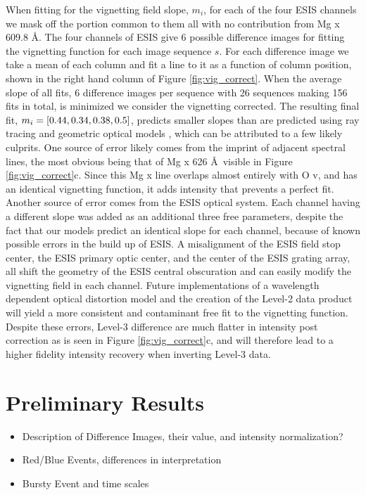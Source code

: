         When fitting for the vignetting field slope, $m_i$, for each  of the four ESIS channels we mask off the portion common to them all with no contribution from Mg {\sc x} 609.8 \AA.
        The four channels of ESIS give 6 possible difference images for fitting the vignetting function for each image sequence $s$. 
        For each difference image we take a mean of each column and fit a line to it as a function of column position, shown in the right hand column of Figure \ref{fig:vig_correct}.
        When the average slope of all fits, 6 difference images per sequence with 26 sequences making 156 fits in total, is minimized we consider the vignetting corrected.
        The resulting final fit, $m_i = [0.44, 0.34, 0.38, 0.5]$, predicts smaller slopes than are predicted using ray tracing and geometric optical models \citep{ESIS}, which can be attributed to a few likely culprits.
        One source of error likely comes from the imprint of adjacent spectral lines, the most obvious being that of Mg {\sc x} 626 \AA \ visible in Figure \ref{fig:vig_correct}c.
        Since this Mg {\sc x} line overlaps almost entirely with O {\sc v}, and has an identical vignetting function, it adds intensity that prevents a perfect fit.
        Another source of error comes from the ESIS optical system.
        Each channel having a different slope was added as an additional three free parameters, despite the fact that our models predict an identical slope for each channel, because of known possible errors in the build up of ESIS.
        A misalignment of the ESIS field stop center, the ESIS primary optic center, and the center of the ESIS grating array, all shift the geometry of the ESIS central obscuration and can easily modify the vignetting field in each channel.
        Future implementations of a wavelength dependent optical distortion model and the creation of the Level-2 data product will yield a more consistent and contaminant free fit to the vignetting function.
        Despite these errors, Level-3 difference are much flatter in intensity post correction as is seen in Figure \ref{fig:vig_correct}c, and will therefore lead to a higher fidelity intensity recovery when inverting Level-3 data.
        

  

\section{Preliminary Results}
        \begin{itemize}
            \item Description of Difference Images, their value, and intensity normalization? 
                \item Red/Blue Events, differences in interpretation
                \item Bursty Event and time scales
        \end{itemize}
